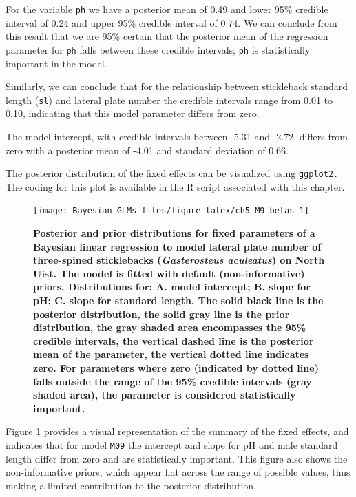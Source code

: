 \documentclass[
]{book}
\begin{document}
For the variable \texttt{ph} we have a posterior mean of 0.49 and lower 95\% credible interval of 0.24 and upper 95\% credible interval of 0.74. We can conclude from this result that we are 95\% certain that the posterior mean of the regression parameter for \texttt{ph} falls between these credible intervals; \texttt{ph} is statistically important in the model.

Similarly, we can conclude that for the relationship between stickleback standard length (\texttt{sl}) and lateral plate number the credible intervals range from 0.01 to 0.10, indicating that this model parameter differs from zero.

The model intercept, with credible intervals between -5.31 and -2.72, differs from zero with a posterior mean of -4.01 and standard deviation of 0.66.

The posterior distribution of the fixed effects can be visualized using \texttt{ggplot2.} The coding for this plot is available in the R script associated with this chapter.



\begin{figure}

{\centering \texttt{[image: Bayesian\_GLMs\_files/figure-latex/ch5-M9-betas-1]} 

}

\caption{\textbf{Posterior and prior distributions for fixed parameters of a Bayesian linear regression to model lateral plate number of three-spined sticklebacks (\emph{Gasterosteus aculeatus}) on North Uist. The model is fitted with default (non-informative) priors. Distributions for: A. model intercept; B. slope for pH; C. slope for standard length. The solid black line is the posterior distribution, the solid gray line is the prior distribution, the gray shaded area encompasses the 95\% credible intervals, the vertical dashed line is the posterior mean of the parameter, the vertical dotted line indicates zero. For parameters where zero (indicated by dotted line) falls outside the range of the 95\% credible intervals (gray shaded area), the parameter is considered statistically important.}}\label{fig:ch5-M9-betas}
\end{figure}

Figure \ref{fig:ch5-M9-betas} provides a visual representation of the summary of the fixed effects, and indicates that for model \texttt{M09} the intercept and slope for pH and male standard length differ from zero and are statistically important. This figure also shows the non-informative priors, which appear flat across the range of possible values, thus making a limited contribution to the posterior distribution.
\end{document}
